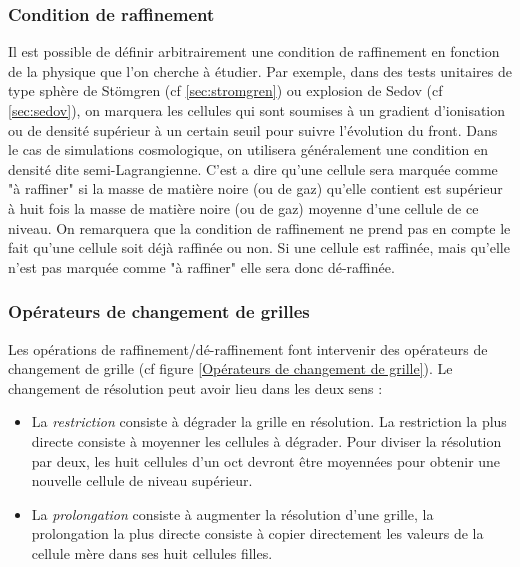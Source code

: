 
\subsubsection{Condition de raffinement}
\label{sec:condraf}

Il est possible de définir arbitrairement une condition de raffinement en fonction de la physique que l'on cherche à étudier.
Par exemple, dans des tests unitaires de type sphère de Stömgren (cf \ref{sec:stromgren}) ou explosion de Sedov (cf \ref{sec:sedov}), on marquera les cellules qui sont soumises à un gradient d'ionisation ou de densité supérieur à un certain seuil pour suivre l'évolution du front.
Dans le cas de simulations cosmologique, on utilisera généralement une condition en densité dite semi-Lagrangienne.
C'est a dire qu'une cellule sera marquée comme "à raffiner" si la masse de matière noire (ou de gaz) qu'elle contient est supérieur à huit fois la masse de matière noire (ou de gaz) moyenne d'une cellule de ce niveau.
On remarquera que la condition de raffinement ne prend pas en compte le fait qu'une cellule soit déjà raffinée ou non.
Si une cellule est raffinée, mais qu'elle n'est pas marquée comme "à raffiner" elle sera donc dé-raffinée.


\subsubsection{Opérateurs de changement de grilles} 
\label{sec_gridchange}

Les opérations de raffinement/dé-raffinement font intervenir des opérateurs de changement de grille (cf figure \ref{Opérateurs de changement de grille}).
Le changement de résolution peut avoir lieu dans les deux sens :

\begin{itemize}
\item La \emph{restriction} consiste à dégrader la grille en résolution. 
La restriction la plus directe consiste à moyenner les cellules à dégrader. 
Pour diviser la résolution par deux, les huit cellules d'un oct devront être moyennées pour obtenir une nouvelle cellule de niveau supérieur.

\item La \emph{prolongation} consiste à augmenter la résolution d'une grille, la prolongation la plus directe consiste à copier directement les valeurs de la cellule mère dans ses huit cellules filles.
\end{itemize}

